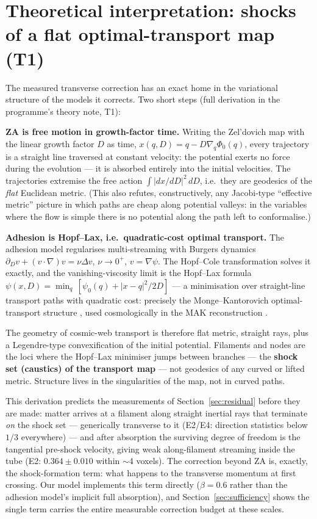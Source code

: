 \documentclass[11pt]{article}
\begin{document}
\section{Theoretical interpretation: shocks of a flat optimal-transport map (T1)}
\label{sec:theory}

The measured transverse correction has an exact home in the variational structure of the models it corrects. Two short steps (full derivation in the programme's theory note, T1):

\textbf{ZA is free motion in growth-factor time.} Writing the Zel'dovich map with the linear growth factor $D$ as time, $x(q, D) = q - D\nabla_q \Phi_0(q)$, every trajectory is a straight line traversed at constant velocity: the potential exerts no force during the evolution --- it is absorbed entirely into the initial velocities. The trajectories extremise the free action $\int |dx/dD|^2\, dD$, i.e.\ they are geodesics of the \emph{flat} Euclidean metric. (This also refutes, constructively, any Jacobi-type ``effective metric'' picture in which paths are cheap along potential valleys: in the variables where the flow is simple there is no potential along the path left to conformalise.)

\textbf{Adhesion is Hopf--Lax, i.e.\ quadratic-cost optimal transport.} The adhesion model regularises multi-streaming with Burgers dynamics $\partial_D v + (v\cdot\nabla)v = \nu\Delta v$, $\nu \to 0^+$, $v = \nabla\psi$. The Hopf--Cole transformation solves it exactly, and the vanishing-viscosity limit is the Hopf--Lax formula $\psi(x, D) = \min_q\, [\psi_0(q) + |x - q|^2/2D]$ --- a minimisation over straight-line transport paths with quadratic cost: precisely the Monge--Kantorovich optimal-transport structure \cite{hopf1950,lax1957,brenier1991}, used cosmologically in the MAK reconstruction \cite{frisch2002,brenier2003}.

The geometry of cosmic-web transport is therefore flat metric, straight rays, plus a Legendre-type convexification of the initial potential. Filaments and nodes are the loci where the Hopf--Lax minimiser jumps between branches --- the \textbf{shock set (caustics) of the transport map} --- not geodesics of any curved or lifted metric. Structure lives in the singularities of the map, not in curved paths.

This derivation predicts the measurements of Section~\ref{sec:residual} before they are made: matter arrives at a filament along straight inertial rays that terminate \emph{on} the shock set --- generically transverse to it (E2/E4: direction statistics below $1/3$ everywhere) --- and after absorption the surviving degree of freedom is the tangential pre-shock velocity, giving weak along-filament streaming inside the tube (E2: $0.364 \pm 0.010$ within $\sim$4 voxels). The correction beyond ZA is, exactly, the shock-formation term: what happens to the transverse momentum at first crossing. Our model implements this term directly ($\beta = 0.6$ rather than the adhesion model's implicit full absorption), and Section~\ref{sec:sufficiency} shows the single term carries the entire measurable correction budget at these scales.
\end{document}
